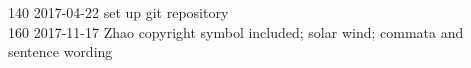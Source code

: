 \begin{footnotesize}
140	2017-04-22	set up git repository\\
160	2017-11-17	Zhao copyright symbol included; solar wind; commata and sentence wording\\

\end{footnotesize}
